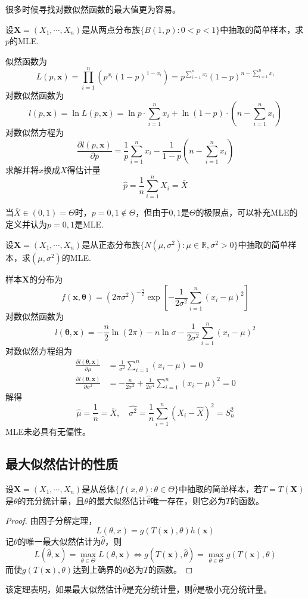 \documentclass{ctexbook}
\begin{document}
很多时候寻找对数似然函数的最大值更为容易。

\begin{example}
    设$\mathbf{X}=(X_1,\cdots,X_n)$是从两点分布族$\{B(1,p):0<p<1\}$中抽取的简单样本，求$p$的MLE.

    似然函数为
    $$L(p,\mathbf{x})=\prod_{i=1}^n (p^{x_i}(1-p)^{1-x_i})=p^{\sum_{i=1}^n x_i}(1-p)^{n-\sum_{i=1}^n x_i}$$
    对数似然函数为
    $$l(p,\mathbf{x})=\ln L(p,\mathbf{x})=\ln p\cdot \sum_{i=1}^n x_i+\ln(1-p)\cdot\left(n-\sum_{i=1}^n x_i\right)$$
    对数似然方程为
    $$\frac{\partial l(p,\mathbf{x})}{\partial p}=\frac{1}{p}\sum_{i=1}^n x_i-\frac{1}{1-p}\left(n-\sum_{i=1}^n x_i\right)$$
    求解并将$x$换成$X$得估计量
    $$\hat{p}=\frac{1}{n}\sum_{i=1}^n X_i=\bar{X}$$

    当$\bar{X}\in(0,1)=\Theta$时，$p=0,1\notin\Theta$，但由于$0,1$是$\Theta$的极限点，可以补充MLE的定义并认为$p=0,1$是MLE.
\end{example}

\begin{example}
    设$\mathbf{X}=(X_1,\cdots,X_n)$是从正态分布族$\{N(\mu,\sigma^2):\mu\in\mathbb{R},\sigma^2>0\}$中抽取的简单样本，求$(\mu,\sigma^2)$的MLE.

    样本$\mathbf{X}$的分布为
    $$f(\mathbf{x},\boldsymbol{\theta})=(2\pi\sigma^2)^{-\frac{n}{2}}\exp\left[-\frac{1}{2\sigma^2}\sum_{i=1}^n (x_i-\mu)^2\right]$$
    对数似然函数为
    $$l(\boldsymbol{\theta},\mathbf{x})=-\frac{n}{2}\ln(2\pi)-n\ln\sigma-\frac{1}{2\sigma^2}\sum_{i=1}^n (x_i-\mu)^2$$
    对数似然方程组为
    \begin{align*}
        \frac{\partial l(\boldsymbol{\theta},\mathbf{x})}{\partial \mu}&=\frac{1}{\sigma^2}\sum_{i=1}^n (x_i-\mu)=0\\
         \frac{\partial l(\boldsymbol{\theta},\mathbf{x})}{\partial \sigma^2}&=-\frac{n}{2\sigma^2}+\frac{1}{2\sigma^4}\sum_{i=1}^n (x_i-\mu)^2=0
    \end{align*}
    解得
    $$\hat{\mu}=\frac{1}{n}=\bar{X},\quad \hat{\sigma^2}=\frac{1}{n}\sum_{i=1}^n(X_i-\hat{X})^2=S_n^2$$
    MLE未必具有无偏性。
\end{example}

\subsection{最大似然估计的性质}

\begin{theorem}
    设$\mathbf{X}=(X_1,\cdots,X_n)$是从总体$\{f(x,\theta):\theta\in\Theta\}$中抽取的简单样本，若$T=T(\mathbf{X})$是$\theta$的充分统计量，且$\theta$的最大似然估计$\hat{\theta}$唯一存在，则它必为$T$的函数。
\end{theorem}
\begin{proof}
    由因子分解定理，
    $$L(\theta,x)=g(T(\mathbf{x}),\theta)h(\mathbf{x})$$
    记$\theta$的唯一最大似然估计为$\hat{\theta}$，则
    $$L(\hat{\theta},\mathbf{x})=\max_{\theta\in\Theta}L(\theta,\mathbf{x})\iff g(T(\mathbf{x}),\hat{\theta})=\max_{\theta\in\Theta}g(T(\mathbf{x}),\theta)$$
    而使$g(T(\mathbf{x}),\theta)$达到上确界的$\theta$必为$T$的函数。
\end{proof}
该定理表明，如果最大似然估计$\hat{\theta}$是充分统计量，则$\hat{\theta}$是极小充分统计量。
\end{document}
